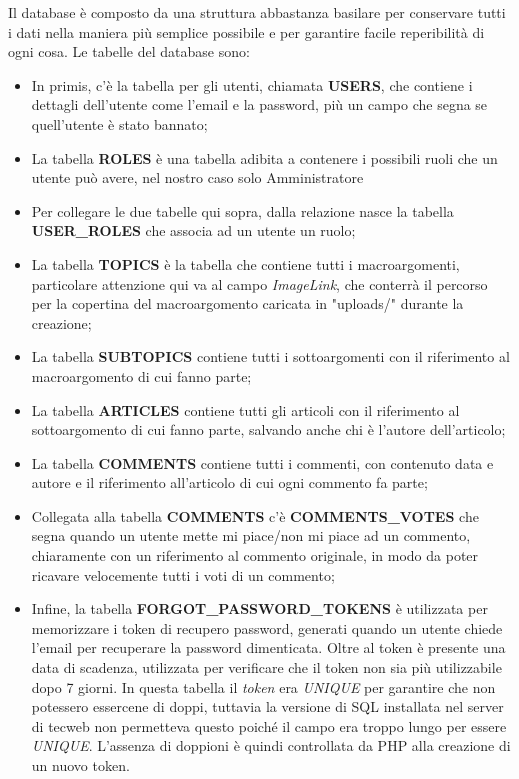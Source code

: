 \documentclass[12pt]{article}
\begin{document}
	Il database è composto da una struttura abbastanza basilare per conservare tutti i dati nella maniera più semplice possibile e per garantire facile reperibilità di ogni cosa. Le tabelle del database sono:
	\begin{itemize}
	\item In primis, c'è la tabella per gli utenti, chiamata \textbf{USERS}, che contiene i dettagli dell'utente come l'email e la password, più un campo che segna se quell'utente è stato bannato;
	\item La tabella \textbf{ROLES} è una tabella adibita a contenere i possibili ruoli che un utente può avere, nel nostro caso solo Amministratore
	\item Per collegare le due tabelle qui sopra, dalla relazione nasce la tabella \textbf{USER\_ROLES} che associa ad un utente un ruolo;
	\item La tabella \textbf{TOPICS} è la tabella che contiene tutti i macroargomenti, particolare attenzione qui va al campo \textit{ImageLink}, che conterrà il percorso per la copertina del macroargomento caricata in "uploads/" durante la creazione;
	\item La tabella \textbf{SUBTOPICS} contiene tutti i sottoargomenti con il riferimento al macroargomento di cui fanno parte;
	\item La tabella \textbf{ARTICLES} contiene tutti gli articoli con il riferimento al sottoargomento di cui fanno parte, salvando anche chi è l'autore dell'articolo;
	\item La tabella \textbf{COMMENTS} contiene tutti i commenti, con contenuto data e autore e il riferimento all'articolo di cui ogni commento fa parte;
	\item Collegata alla tabella \textbf{COMMENTS} c'è \textbf{COMMENTS\_VOTES} che segna quando un utente mette mi piace/non mi piace ad un commento, chiaramente con un riferimento al commento originale, in modo da poter ricavare velocemente tutti i voti di un commento;
	\item Infine, la tabella \textbf{FORGOT\_PASSWORD\_TOKENS} è utilizzata per memorizzare i token di recupero password, generati quando un utente chiede l'email per recuperare la password dimenticata. Oltre al token è presente una data di scadenza, utilizzata per verificare che il token non sia più utilizzabile dopo 7 giorni. In questa tabella il \textit{token} era \textit{UNIQUE} per garantire che non potessero essercene di doppi, tuttavia la versione di SQL installata nel server di tecweb non permetteva questo poiché il campo era troppo lungo per essere \textit{UNIQUE}. L'assenza di doppioni è quindi controllata da PHP alla creazione di un nuovo token.
	\end{itemize}
	
\end{document}
